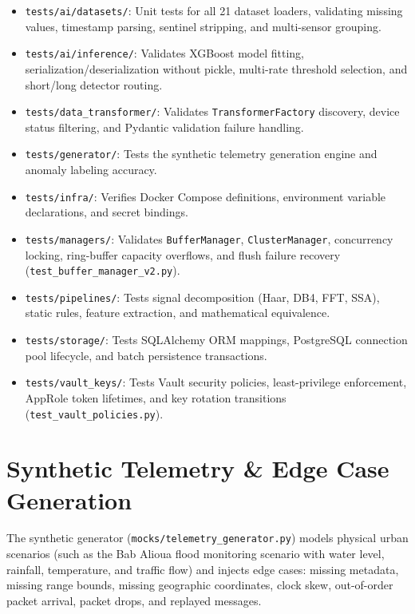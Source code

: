 \documentclass[10pt,a4paper]{report}
\begin{document}
\begin{itemize}[leftmargin=*]
  \item \texttt{tests/ai/datasets/}: Unit tests for all 21 dataset loaders, validating missing values, timestamp parsing, sentinel stripping, and multi-sensor grouping.
  \item \texttt{tests/ai/inference/}: Validates XGBoost model fitting, serialization/deserialization without pickle, multi-rate threshold selection, and short/long detector routing.
  \item \texttt{tests/data\_transformer/}: Validates \texttt{TransformerFactory} discovery, device status filtering, and Pydantic validation failure handling.
  \item \texttt{tests/generator/}: Tests the synthetic telemetry generation engine and anomaly labeling accuracy.
  \item \texttt{tests/infra/}: Verifies Docker Compose definitions, environment variable declarations, and secret bindings.
  \item \texttt{tests/managers/}: Validates \texttt{BufferManager}, \texttt{ClusterManager}, concurrency locking, ring-buffer capacity overflows, and flush failure recovery (\texttt{test\_buffer\_manager\_v2.py}).
  \item \texttt{tests/pipelines/}: Tests signal decomposition (Haar, DB4, FFT, SSA), static rules, feature extraction, and mathematical equivalence.
  \item \texttt{tests/storage/}: Tests SQLAlchemy ORM mappings, PostgreSQL connection pool lifecycle, and batch persistence transactions.
  \item \texttt{tests/vault\_keys/}: Tests Vault security policies, least-privilege enforcement, AppRole token lifetimes, and key rotation transitions (\texttt{test\_vault\_policies.py}).
\end{itemize}

\section{Synthetic Telemetry \& Edge Case Generation}
The synthetic generator (\texttt{mocks/telemetry\_generator.py}) models physical urban scenarios (such as the Bab Alioua flood monitoring scenario with water level, rainfall, temperature, and traffic flow) and injects edge cases: missing metadata, missing range bounds, missing geographic coordinates, clock skew, out-of-order packet arrival, packet drops, and replayed messages.
\end{document}
